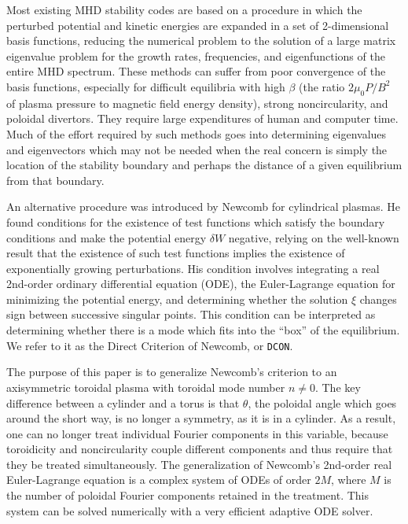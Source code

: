 \documentclass[prb,twocolumn,showpacs,preprintnumbers,amsmath,amssymb]{revtex4}
\begin{document}
Most existing MHD stability codes\cite{rcg76, rg81, wk76, lcb81, lmd84,
rcg83} are based on a procedure in which the perturbed potential and
kinetic energies are expanded in a set of 2-dimensional basis functions,
reducing the numerical problem to the solution of a large matrix
eigenvalue problem for the growth rates, frequencies, and eigenfunctions
of the entire MHD spectrum.  These methods can suffer from poor
convergence of the basis functions, especially for difficult equilibria
with high $\beta$ (the ratio $2 \mu_0 P/ B^2$ of plasma pressure to
magnetic field energy density), strong noncircularity, and poloidal
divertors.  They require large expenditures of human and computer time.
Much of the effort required by such methods goes into determining
eigenvalues and eigenvectors which may not be needed when the real
concern is simply the location of the stability boundary and perhaps the
distance of a given equilibrium from that boundary.

An alternative procedure was introduced by Newcomb for cylindrical
plasmas.\cite{wan60} He found conditions for the existence of test
functions which satisfy the boundary conditions and make the potential
energy $\delta W$ negative, relying on the well-known result that the
existence of such test functions implies the existence of exponentially
growing perturbations.  His condition involves integrating a real
2nd-order ordinary differential equation (ODE), the Euler-Lagrange
equation for minimizing the potential energy, and determining whether
the solution $\xi$ changes sign between successive singular points.
This condition can be interpreted as determining whether there is a mode
which fits into the ``box'' of the equilibrium.  We refer to it as the
Direct Criterion of Newcomb, or \texttt{DCON}.

The purpose of this paper is to generalize Newcomb's criterion to an
axisymmetric toroidal plasma with toroidal mode number $n \ne 0$.  The
key difference between a cylinder and a torus is that $\theta$, the
poloidal angle which goes around the short way, is no longer a symmetry,
as it is in a cylinder.  As a result, one can no longer treat individual
Fourier components in this variable, because toroidicity and
noncircularity couple different components and thus require that they be
treated simultaneously.  The generalization of Newcomb's 2nd-order real
Euler-Lagrange equation is a complex system of ODEs of order $2M$, where
$M$ is the number of poloidal Fourier components retained in the
treatment.  This system can be solved numerically with a very efficient
adaptive ODE solver.
\end{document}

